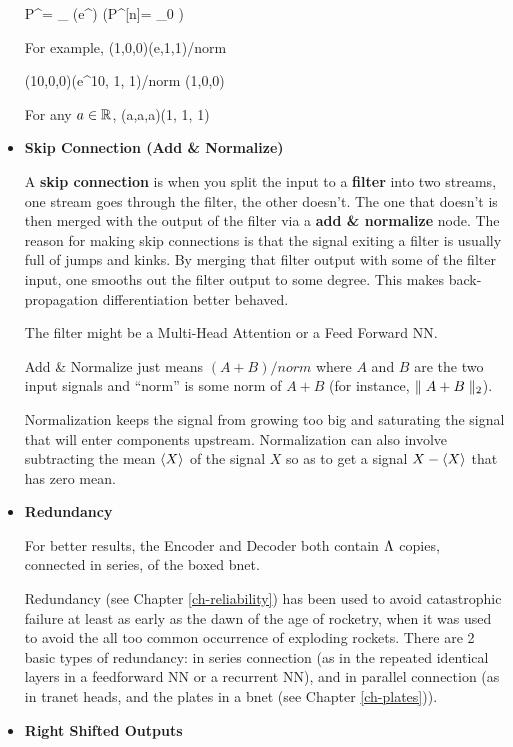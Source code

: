\begin{itemize}
\beq
P^\alp=
{\sum_{\alp\in[n]} \exp(e^\alp )}
\;\;
\left(P^{[n]}=
{_0}
\right)
\eeq

For example,
\beq
(1,0,0)\rarrow (e,1,1)/norm
\eeq

\beq
(10,0,0)\rarrow (e^{10}, 1, 1)/norm \approx (1,0,0)
\eeq

For any $a\in{ \mathbb{R}}$,
\beq
(a,a,a)\rarrow {}(1, 1, 1)
\eeq


\item {\bf Skip Connection (Add \& Normalize)}

A {\bf skip connection} is when you split the
input to a {\bf filter} into two streams, one stream goes through
the filter, the other doesn't. The one that doesn't
is then merged with the output of the filter via a {\bf add \& normalize} node. The reason for making skip connections
is that the signal exiting a filter is usually full of
jumps and kinks. By merging that filter output
with some  of the filter input, one smooths out the filter output
to some degree. This makes back-propagation differentiation
better behaved.

The filter might be a Multi-Head Attention or a Feed Forward NN.

Add \& Normalize just means $(A + B)/norm$ where $A$ and $B$
are the two input signals and \enquote{norm} is some norm of $A+B$ (for
instance, $\parallel A+B\parallel_2$).

Normalization keeps the signal from growing too big and saturating the signal that will enter components upstream.
Normalization can also involve subtracting the mean $\left\langle X\right\rangle$ of the signal $X$  so as to get a signal $X-\left\langle X\right\rangle$  that has zero mean.

\item {\bf Redundancy}

For better results, the Encoder
and Decoder both contain $\Lambda$ 
copies, connected in series, of the boxed bnet.

Redundancy (see Chapter \ref{ch-reliability}) has been used to
avoid catastrophic failure at least as early as
the dawn of the age
of rocketry, when it
was used to avoid the all too common 
occurrence of exploding rockets.
There are 2 basic types of
redundancy: in series connection (as in the repeated identical
layers in a feedforward
NN or a recurrent NN),
and in parallel connection (as in  
tranet heads, and the plates in a bnet (see Chapter \ref{ch-plates})).

\item{\bf Right Shifted Outputs}


\end{itemize}
